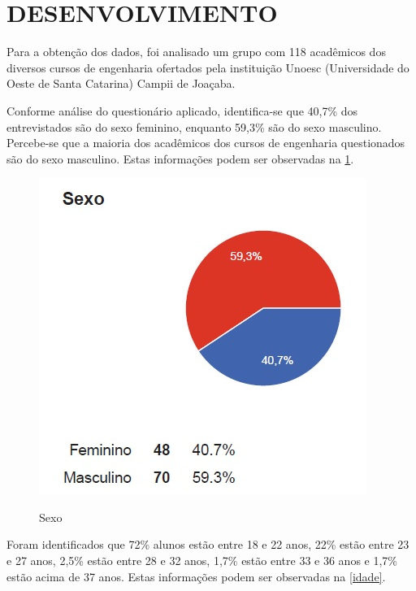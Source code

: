 \documentclass[
	article,			%
	11pt,				%
	oneside,			%
	a4paper,			%
	english,			%
	brazil,				%
	sumario=tradicional
	]{abntex2}
\begin{document}
\section{DESENVOLVIMENTO}
Para a obtenção dos dados, foi analisado um grupo com 118 acadêmicos dos diversos cursos de engenharia ofertados pela instituição Unoesc (Universidade do Oeste de Santa Catarina) Campii de Joaçaba.

Conforme análise do questionário aplicado, identifica-se que 40,7\% dos entrevistados são do sexo feminino, enquanto 59,3\% são do sexo masculino.
Percebe-se que a maioria dos acadêmicos dos cursos de engenharia questionados são do sexo masculino. Estas informações podem ser observadas na \figurename{ \ref{sexo}}.

\begin{figure}[h]  
	\begin{center} 
		\begin{center}
			\changecaptionwidth 
			\captionwidth{13.5cm} %
			\caption{\label{sexo} Sexo}
		 	{\includegraphics[scale=0.8]{imagens/sexo}}
		\end{center}
	\end{center}
\end{figure}
\FloatBarrier


Foram identificados que 72\% alunos estão entre 18 e 22 anos, 22\% estão entre 23 e 27 anos, 2,5\% estão entre 28 e 32 anos, 1,7\% estão entre 33 e 36 anos e 1,7\% estão acima de 37 anos. Estas informações podem ser observadas na \figurename{ \ref{idade}}.
\end{document}
